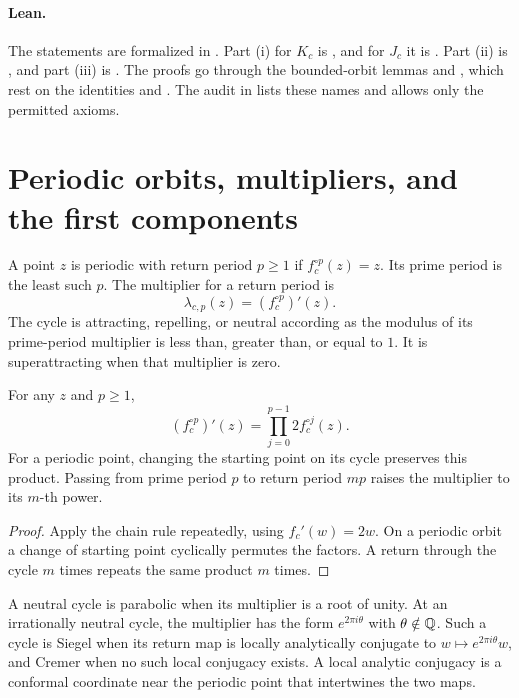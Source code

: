 \paragraph{Lean.}
The statements are formalized in .  Part (i) for $K_c$ is
, and for $J_c$ it is
.  Part (ii) is
, and part (iii) is
.  The proofs go through the bounded-orbit lemmas
 and , which rest on the identities
 and .  The audit in  lists these names and allows only
the permitted axioms.

\section{Periodic orbits, multipliers, and the first components}

\begin{definition}
A point $z$ is periodic with return period $p\ge1$ if
$f_c^{\circ p}(z)=z$.  Its prime period is the least such $p$.
The multiplier for a return period is
\[
 \lambda_{c,p}(z)=(f_c^{\circ p})'(z).
\]
The cycle is attracting, repelling, or neutral according as the
modulus of its prime-period multiplier is less than, greater than,
or equal to $1$.  It is superattracting when that multiplier is zero.
\end{definition}

\begin{proposition}
For any $z$ and $p\ge1$,
\[
 (f_c^{\circ p})'(z)
   =\prod_{j=0}^{p-1}2f_c^{\circ j}(z).
\]
For a periodic point, changing the starting point on its cycle
preserves this product.  Passing from prime period $p$ to return
period $mp$ raises the multiplier to its $m$-th power.
\end{proposition}

\begin{proof}
Apply the chain rule repeatedly, using $f_c'(w)=2w$.
On a periodic orbit a change of starting point cyclically permutes
the factors.  A return through the cycle $m$ times repeats the
same product $m$ times.
\end{proof}

\begin{definition}
A neutral cycle is parabolic when its multiplier is a root of
unity.  At an irrationally neutral cycle, the multiplier has the
form $e^{2\pi i\theta}$ with $\theta\notin\mathbb Q$.
Such a cycle is Siegel when its return map is locally analytically
conjugate to $w\mapsto e^{2\pi i\theta}w$, and Cremer when no such
local conjugacy exists.  A local analytic conjugacy is a conformal
coordinate near the periodic point that intertwines the two maps.
\end{definition}

